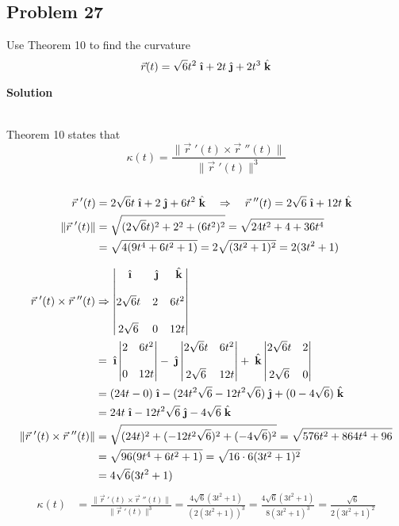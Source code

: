 \documentclass{article}
\newcommand{\ihat}{\;\hat{\textbf{\i}}}
\newcommand{\jhat}{\;\hat{\textbf{\j}}}
\newcommand{\khat}{\;\hat{\textbf{k}}}
\newcommand{\rvec}{\vec{r}(t)}
\newcommand{\drvec}{\vec{r}\;'(t)}
\newcommand\rr{\quad\Rightarrow\quad}
\begin{document}
\subsection*{Problem 27}
Use Theorem 10 to find the curvature
\[
    \rvec = \sqrt{6}t^2\ihat + 2t\jhat + 2t^3\khat
\]
\centerline{\textbf{Solution}} \\
Theorem 10 states that $$\kappa(t) = \frac{\|\drvec \times \vec r \;''(t)\|}{\|\drvec\|^3}$$ \\
\begin{align*}
    \vec r \;'(t) &= 2\sqrt 6t \ihat + 2\jhat + 6t^2\khat \rr \vec r \;''(t) = 2\sqrt 6\ihat + 12t\khat \\
    \|\drvec\| &= \sqrt{(2\sqrt 6t)^2 + 2^2 + (6t^2)^2} = \sqrt{24t^2 + 4 + 36t^4} \\ 
               &= \sqrt{4(9t^4 + 6t^2 + 1)} = 2\sqrt{(3t^2 +1)^2} = 2(3t^2+1) \\
\end{align*}

\begin{align*}
    \drvec \times \vec r \;''(t)&  \Rightarrow 
\begin{vmatrix}
    \ihat & \jhat & \khat \\
    \\
    2\sqrt 6t & 2 & 6t^2 \\
    \\
    2\sqrt 6 & 0 & 12t
    \end{vmatrix} \\ 
&= \ihat \begin{vmatrix} 2 & 6t^2 \\\\ 0 & 12t \end{vmatrix} - \jhat \begin{vmatrix} 2\sqrt 6t & 6t^2 \\\\ 2\sqrt 6 & 12t \end{vmatrix} + \khat \begin{vmatrix} 2\sqrt 6t & 2 \\\\ 2\sqrt 6 & 0 \end{vmatrix} \\ 
&= (24t - 0)\ihat - (24t^2\sqrt{6} - 12t^2\sqrt{6})\jhat + (0 - 4\sqrt 6)\khat \\ 
&= 24t\ihat - 12t^2\sqrt 6\jhat - 4\sqrt 6\khat \\
    \| \drvec \times \vec r \;''(t) \| &= \sqrt{ (24t)^2 + (-12t^2\sqrt 6)^2 + (-4\sqrt 6)^2} = \sqrt{576t^2 + 864t^4 + 96} \\ 
                                       &= \sqrt{96(9t^4 + 6t^2 + 1)} = \sqrt{16 \cdot 6(3t^2 + 1)^2} \\
                                       &= 4\sqrt 6(3t^2 + 1) \\
\end{align*}
\begin{align*}
    \kappa(t) &= \frac{\|\drvec \times \vec r \;''(t)\|}{\|\drvec\|^3} = \frac{4\sqrt 6(3t^2 + 1)}{(2(3t^2+1))^3} = \frac{4\sqrt 6(3t^2 + 1)}{8(3t^2+1)^3} = \frac{\sqrt 6}{2(3t^2+1)^2}
\end{align*}
                                             
\end{document}
